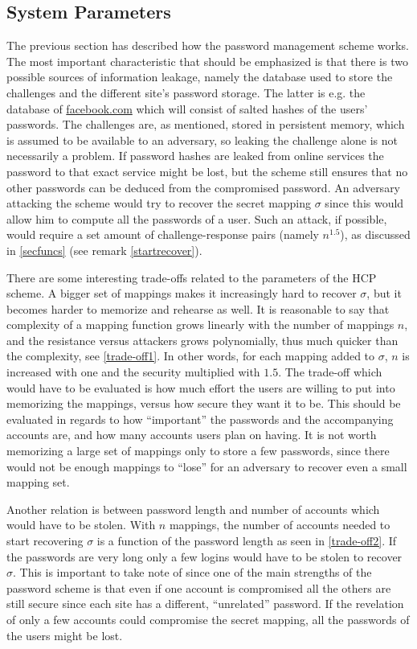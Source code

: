 \subsection{System Parameters} \label{sec-params}
\par The previous section has described how the password management scheme works. The most important characteristic that should be emphasized is that there is two possible sources of information leakage, namely the database used to store the challenges and the different site's password storage. The latter is e.g. the database of \url{facebook.com} which will consist of salted hashes of the users' passwords. The challenges are, as mentioned, stored in persistent memory, which is assumed to be available to an adversary, so leaking the challenge alone is not necessarily a problem. If password hashes are leaked from online services the password to that exact service might be lost, but the scheme still ensures that no other passwords can be deduced from the compromised password. An adversary attacking the scheme would try to recover the secret mapping $\sigma$ since this would allow him to compute all the passwords of a user. Such an attack, if possible, would require a set amount of challenge-response pairs (namely $n^{1.5}$), as discussed in \autoref{secfuncs} (see remark \ref{startrecover}).
\par There are some interesting trade-offs related to the parameters of the HCP scheme. A bigger set of mappings makes it increasingly hard to recover $\sigma$, but it becomes  harder to memorize and rehearse as well. It is reasonable to say that complexity of a mapping function grows linearly with the number of mappings $n$, and the resistance versus attackers grows polynomially, thus much quicker than the complexity, see \autoref{trade-off1}. In other words, for each mapping added to $\sigma$, $n$ is increased with one and the security multiplied with $1.5$. The trade-off which would have to be evaluated is how much effort the users are willing to put into memorizing the mappings, versus how secure they want it to be. This should be evaluated in regards to how ``important'' the passwords and the accompanying accounts are, and how many accounts users plan on having. It is not worth memorizing a large set of mappings only to store a few passwords, since there would not be enough mappings to ``lose'' for an adversary to recover even a small mapping set.
\par Another relation is between password length and number of accounts which would have to be stolen. With $n$ mappings, the number of accounts needed to start recovering $\sigma$ is a function of the password length as seen in \autoref{trade-off2}. If the passwords are very long only a few logins would have to be stolen to recover $\sigma$. This is important to take note of since one of the main strengths of the password scheme is that even if one account is compromised all the others are still secure since each site has a different, ``unrelated'' password. If the revelation of only a few accounts could compromise the secret mapping, all the passwords of the users might be lost.

